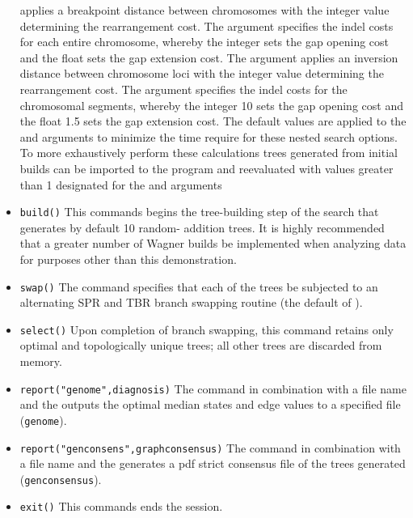 \begin{itemize}
applies a breakpoint distance between chromosomes with the integer value determining the rearrangement cost. The 
argument  specifies the indel costs for each entire chromosome, whereby the 
integer sets the gap opening cost and the float sets the gap extension cost.  The argument  applies an inversion distance between chromosome loci with the integer value determining the rearrangement 
cost. The argument  specifies the indel costs for the chromosomal segments, 
whereby the integer 10 sets the gap opening cost and the float 1.5 sets the gap extension cost.  The default values 
are applied to the  and  arguments to minimize the time require for 
these nested search options.   To more exhaustively perform these calculations trees generated from initial builds 
can be imported to the program and reevaluated with values greater than 1 designated for the  
and  arguments
\item \texttt{build()} This commands begins the tree-building step of the search that generates by default 10 random-
addition trees.  It is highly recommended that a greater number of Wagner builds be implemented when analyzing 
data for purposes other than this demonstration.
\item \texttt{swap()} The  command specifies that each of the trees be subjected to an alternating 
SPR and TBR branch swapping routine (the default of \poy).
\item \texttt{select()} Upon completion of branch swapping, this command retains only optimal and topologically 
unique trees; all other trees are discarded from memory. 
\item \texttt{report("genome",diagnosis)}  The  command in combination with a file name and the
  outputs the optimal median states and edge values to a specified file (\texttt{genome}). 
\item \texttt{report("genconsens",graphconsensus)}  The  command in combination with a file 
name and the  generates a pdf strict consensus file of the trees generated 
(\texttt{genconsensus}). 
\item \texttt{exit()} This commands ends the \poy session.
\end{itemize}


